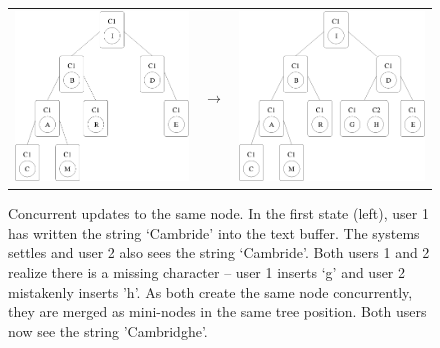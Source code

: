 \documentclass[12pt,a4paper,twoside,openright]{report}
\begin{document}
\begin{figure}[htb]
\centering
  \begin{tabular}{ >{\centering}m{6cm} >{\centering}m{15mm} >{\centering\arraybackslash}m{6cm} }
    \includegraphics[width=1\linewidth]{figs/treedoc_1.eps}  &
    $\longrightarrow$  &
    \includegraphics[width=1\linewidth]{figs/treedoc_2.eps}
  \end{tabular}
\caption[Concurrent Updates in Treedoc]{Concurrent updates to the same node. In the first state (left), user 1 has written the string `Cambride' into the text buffer. The systems settles and user 2 also sees the string `Cambride'. Both users 1 and 2 realize there is a missing character -- user 1 inserts `g' and user 2 mistakenly inserts 'h'. As both create the same node concurrently, they are merged as mini-nodes in the same tree position. Both users now see the string 'Cambridghe'.}
\label{fig:treedoc}
\end{figure}
\end{document}
